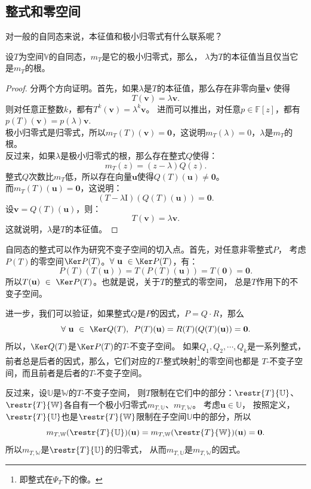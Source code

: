 \documentclass[12pt,UTF8]{ctexbook}
\begin{document}
\subsection{整式和零空间}
对一般的自同态来说，本征值和极小归零式有什么联系呢？
\begin{pp}\label{pp:6_3}
    设$T$为空间$\mathbb{V}$的自同态，$m_T$是它的极小归零式，那么，
    $\lambda$为$T$的本征值当且仅当它是$m_T$的根。
\end{pp}
\begin{proof} %
    分两个方向证明。首先，如果$\lambda$是$T$的本征值，那么存在非零向量$\mathbf{v}$
    使得
    $$ T(\mathbf{v}) = \lambda \mathbf{v}.$$
    则对任意正整数$k$，都有$T^k(\mathbf{v}) = \lambda^k \mathbf{v}$。
    进而可以推出，对任意$p\in\mathbb{F}[z]$，都有$p(T)(\mathbf{v}) = p(\lambda) \mathbf{v}.$\\
    极小归零式是归零式，所以$m_T(T)(\mathbf{v}) = \mathbf{0}$，这说明$m_T(\lambda) = 0$，$\lambda$是$m_T$的根。\\
    反过来，如果$\lambda$是极小归零式的根，那么存在整式$Q$使得：
    $$ m_T(z) = (z - \lambda)Q(z).$$
    整式$Q$次数比$m_T$低，所以存在向量$\mathbf{u}$使得$Q(T)(\mathbf{u}) \neq \mathbf{0}$。\\
    而$m_T(T)(\mathbf{u}) = \mathbf{0}$，这说明：
    $$ (T - \lambda \mathrm{I})(Q(T)(\mathbf{u})) = \mathbf{0}.$$
    设$\mathbf{v} = Q(T)(\mathbf{u})$，则：
    $$ T(\mathbf{v}) = \lambda \mathbf{v}.$$
    这就说明，$\lambda$是$T$的本征值。

\end{proof}


自同态的整式可以作为研究不变子空间的切入点。首先，对任意非零整式$P$，
考虑$P(T)$的零空间$\Ker P(T)$。$\forall \,\, \mathbf{u} \,\, \in \Ker P(T)$，有：
$$ P(T)(T(\mathbf{u})) = T(P(T)(\mathbf{u})) = T(\mathbf{0}) = \mathbf{0}.$$
所以$T(\mathbf{u})\,\,\in\,\,\Ker P(T)$。也就是说，关于$T$的整式的零空间，
总是$T$作用下的不变子空间。

进一步，我们可以验证，如果整式$Q$是$P$的因式，$P = Q\cdot R$，那么
$$ \forall \,\, \mathbf{u} \,\,\in \,\, \Ker Q(T),\,\,\, P(T)(\mathbf{u}) = R(T)(Q(T)(\mathbf{u})) = \mathbf{0}.$$
所以，$\Ker Q(T)$是$\Ker P(T)$的$T$-不变子空间。
如果$Q_1, Q_2, \cdots ,Q_k$是一系列整式，前者总是后者的因式，那么，它们对应的$T$-整式映射\footnote{即整式在$\Psi_T$下的像。}的零空间也都是
$T$-不变子空间，而且前者是后者的$T$-不变子空间。

反过来，设$\mathbb{U}$是$\mathbb{W}$的$T$-不变子空间，
则$T$限制在它们中的部分：$\restr{T}{\mathbb{U}}$、$\restr{T}{\mathbb{W}}$各自有一个极小归零式$m_{T,\mathbb{U}}$、$m_{T,\mathbb{W}}$。
考虑$\mathbf{u} \in \mathbb{U}$，
按照定义，$\restr{T}{\mathbb{U}}$也是$\restr{T}{\mathbb{W}}$限制在子空间$\mathbb{U}$中的部分，所以
$$m_{T,\mathbb{W}}(\restr{T}{\mathbb{U}})(\mathbf{u}) = m_{T,\mathbb{W}}(\restr{T}{\mathbb{W}})(\mathbf{u}) = \mathbf{0}.$$
所以$m_{T,\mathbb{W}}$是$\restr{T}{\mathbb{U}}$的归零式，
从而$m_{T,\mathbb{U}}$是$m_{T,\mathbb{W}}$的因式。
\end{document}
